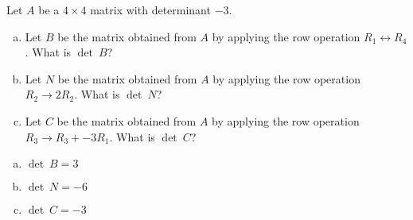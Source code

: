 
\begin{exerciseStatement}


Let \(A\) be a \(4 \times 4\) matrix with determinant \( -3 \).


\begin{enumerate}[(a)]
\item Let \(B\) be the matrix obtained from \(A\) by applying the row operation \( R_1 \leftrightarrow R_4 \). What is \(\operatorname{det}\ B\)?
\item Let \(N\) be the matrix obtained from \(A\) by applying the row operation \( R_2 \to 2R_2 \). What is \(\operatorname{det}\ N\)?
\item Let \(C\) be the matrix obtained from \(A\) by applying the row operation \( R_3 \to R_3 + -3R_1 \). What is \(\operatorname{det}\ C\)?
\end{enumerate}
    
\end{exerciseStatement}
    
\begin{exerciseAnswer} 

\begin{enumerate}[(a)]
\item \(\operatorname{det}\ B= 3 \)
\item \(\operatorname{det}\ N= -6 \)
\item \(\operatorname{det}\ C= -3 \)
\end{enumerate}
    
\end{exerciseAnswer}
    
